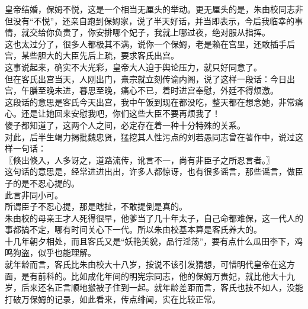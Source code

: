 \begin{multicols}{\theparacolNo}
皇帝结婚，保姆不悦，这是一个相当无厘头的举动。更无厘头的是，朱由校同志非但没有“不悦”，还亲自跑到保姆家，说了半天好话，并当即表示，今后我临幸的事情，就交给你负责了，你安排哪个妃子，我就上哪过夜，绝对服从指挥。\\

这也太过分了，很多人都极其不满，说你一个保姆，老是赖在宫里，还敢插手后宫，某些胆大的大臣先后上疏，要求客氏出宫。\\

这事说起来，确实不大光彩，皇帝大人迫于舆论压力，就只好同意了。\\

但在客氏出宫当天，人刚出门，熹宗就立刻传谕内阁，说了这样一段话：今日出宫，午膳至晚未进，暮思至晚，痛心不已，着时进宫奉慰，外廷不得烦激。\\

这段话的意思是客氏今天出宫，我中午饭到现在都没吃，整天都在想念她，非常痛心。还是让她回来安慰我吧，你们这些大臣不要再烦我了！\\

傻子都知道了，这两个人之间，必定存在着一种十分特殊的关系。\\

对此，后半生竭力揭批魏忠贤，猛挖其人性污点的刘若愚同志曾在著作中，说过这样一句话：\\

〖倏出倏入，人多讶之，道路流传，讹言不一，尚有非臣子之所忍言者。〗\\

这句话的意思是，经常进进出出，许多人都惊讶，也有很多谣言，那些谣言，做臣子的是不忍心提的。\\

此言非同小可。\\

所谓臣子不忍心提，那是瞎扯，不敢提倒是真的。\\

朱由校的母亲王才人死得很早，他爹当了几十年太子，自己命都难保，这一代人的事都搞不定，哪有时间关心下一代。所以朱由校基本算是客氏养大的。\\

十几年朝夕相处，而且客氏又是“妖艳美貌，品行淫荡”，要有点什么瓜田李下，鸡鸣狗盗，似乎也能理解。\\

就年龄而言，客氏比朱由校大十八岁，按说不该引发猜想，可惜明代皇帝在这方面，是有前科的。比如成化年间的明宪宗同志，他的保姆万贵妃，就比他大十九岁，后来还名正言顺地搬被子住到一起。就年龄差距而言，客氏也技不如人，没能打破万保姆的记录，如此看来，传点绯闻，实在比较正常。\\


\end{multicols}

